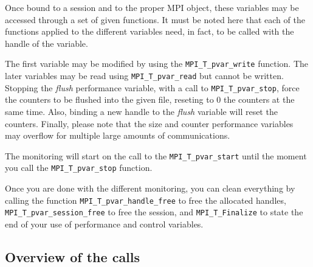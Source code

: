 \documentclass[notitlepage]{article}
\newcommand{\brkunds}[0]{\allowbreak\_}
\begin{document}
Once bound to a session and to the proper MPI object, these variables
may be accessed through a set of given functions. It must be noted
here that each of the functions applied to the different variables
need, in fact, to be called with the handle of the variable.

The first variable may be modified by using the
\texttt{MPI\brkunds{}T\brkunds{}pvar\brkunds{}write} function. The
later variables may be read using
\texttt{MPI\brkunds{}T\brkunds{}pvar\brkunds{}read} but cannot be
written. Stopping the \textit{flush} performance variable, with a call
to \texttt{MPI\brkunds{}T\brkunds{}pvar\brkunds{}stop}, force the
counters to be flushed into the given file, reseting to 0 the counters
at the same time. Also, binding a new handle to the \textit{flush}
variable will reset the counters. Finally, please note that the size
and counter performance variables may overflow for multiple large
amounts of communications.

The monitoring will start on the call to the
\texttt{MPI\brkunds{}T\brkunds{}pvar\brkunds{}start} until the moment
you call the \texttt{MPI\brkunds{}T\brkunds{}pvar\brkunds{}stop}
function.

Once you are done with the different monitoring, you can clean
everything by calling the function
\texttt{MPI\brkunds{}T\brkunds{}pvar\brkunds{}handle\brkunds{}free} to
free the allocated handles,
\texttt{MPI\brkunds{}T\brkunds{}pvar\brkunds{}session\brkunds{}free}
to free the session, and \texttt{MPI\brkunds{}T\brkunds{}Finalize} to
state the end of your use of performance and control variables.

\subsection{Overview of the calls}
\end{document}
